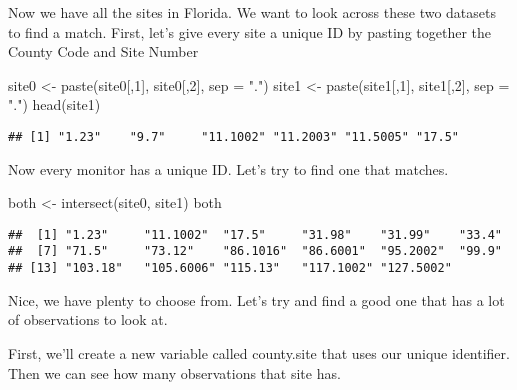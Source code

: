 \documentclass[
]{article}
\newenvironment{Shaded}{\begin{snugshade}}{\end{snugshade}}
\newcommand{\AttributeTok}[1]{\textcolor[rgb]{0.77,0.63,0.00}{#1}}
\newcommand{\DecValTok}[1]{\textcolor[rgb]{0.00,0.00,0.81}{#1}}
\newcommand{\FunctionTok}[1]{\textcolor[rgb]{0.00,0.00,0.00}{#1}}
\newcommand{\NormalTok}[1]{#1}
\newcommand{\OtherTok}[1]{\textcolor[rgb]{0.56,0.35,0.01}{#1}}
\newcommand{\SpecialCharTok}[1]{\textcolor[rgb]{0.00,0.00,0.00}{#1}}
\newcommand{\StringTok}[1]{\textcolor[rgb]{0.31,0.60,0.02}{#1}}
\begin{document}
Now we have all the sites in Florida. We want to look across these two
datasets to find a match. First, let's give every site a unique ID by
pasting together the County Code and Site Number

\begin{Shaded}
\begin{Highlighting}[]
\NormalTok{site0 }\OtherTok{\textless{}{-}} \FunctionTok{paste}\NormalTok{(site0[,}\DecValTok{1}\NormalTok{], site0[,}\DecValTok{2}\NormalTok{], }\AttributeTok{sep =} \StringTok{"."}\NormalTok{)}
\NormalTok{site1 }\OtherTok{\textless{}{-}} \FunctionTok{paste}\NormalTok{(site1[,}\DecValTok{1}\NormalTok{], site1[,}\DecValTok{2}\NormalTok{], }\AttributeTok{sep =} \StringTok{"."}\NormalTok{)}
\FunctionTok{head}\NormalTok{(site1)}
\end{Highlighting}
\end{Shaded}

\begin{verbatim}
## [1] "1.23"    "9.7"     "11.1002" "11.2003" "11.5005" "17.5"
\end{verbatim}

Now every monitor has a unique ID. Let's try to find one that matches.

\begin{Shaded}
\begin{Highlighting}[]
\NormalTok{both }\OtherTok{\textless{}{-}} \FunctionTok{intersect}\NormalTok{(site0, site1)}
\NormalTok{both}
\end{Highlighting}
\end{Shaded}

\begin{verbatim}
##  [1] "1.23"     "11.1002"  "17.5"     "31.98"    "31.99"    "33.4"    
##  [7] "71.5"     "73.12"    "86.1016"  "86.6001"  "95.2002"  "99.9"    
## [13] "103.18"   "105.6006" "115.13"   "117.1002" "127.5002"
\end{verbatim}

Nice, we have plenty to choose from. Let's try and find a good one that
has a lot of observations to look at.

First, we'll create a new variable called county.site that uses our
unique identifier. Then we can see how many observations that site has.

\begin{Shaded}
\end{Shaded}
\end{document}
